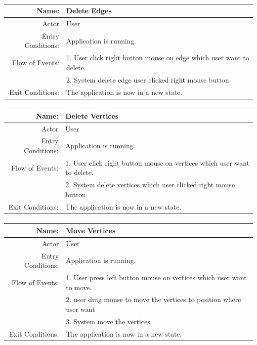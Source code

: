 \documentclass[a4paper,10pt]{article}
\begin{document}
\paragraph{}
\begin{tabular}{|r|l|}
\hline
Name: & Delete Edges \\
\hline
Actor & User \\
\hline
Entry Conditions: & Application is running. \\
\hline
Flow of Events: & 1. User click right button mouse on edge which user want to delete. \\
& 2. System delete edge user clicked right mouse button  \\

\hline
Exit Conditions: & The application is now in a new state. \\
\hline

\end{tabular}
\paragraph{}
\begin{tabular}{|r|l|}
\hline
Name: & Delete Vertices \\
\hline
Actor & User \\
\hline
Entry Conditions: & Application is running. \\
\hline
Flow of Events: & 1. User click right button mouse on vertices which user want to delete. \\
& 2. System delete vertices which user clicked right mouse button  \\
\hline
Exit Conditions: & The application is now in a new state. \\
\hline

\end{tabular}
\paragraph{}

\begin{tabular}{|r|l|}
\hline
Name: & Move Vertices \\
\hline
Actor & User \\
\hline
Entry Conditions: & Application is running. \\
\hline
Flow of Events: & 1. User press left button mouse on vertices which user want to move. \\
& 2. user drag mouse to move the vertices to position where user want  \\

& 3. System move the vertices  \\
\hline
Exit Conditions: & The application is now in a new state. \\
\hline

\end{tabular}
\end{document}
